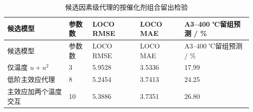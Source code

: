\begin{longtable}{L{0.28\textwidth}C{0.11\textwidth}C{0.16\textwidth}C{0.16\textwidth}C{0.19\textwidth}}
\caption{候选因素级代理的按催化剂组合留出检验}\label{tab:q3-proxy-loco}\\
\toprule
候选模型 & 参数数 & LOCO RMSE & LOCO MAE & A3--400 ℃留组预测 / \% \\
\midrule
\endfirsthead
\toprule
候选模型 & 参数数 & LOCO RMSE & LOCO MAE & A3--400 ℃留组预测 / \% \\
\midrule
\endhead
仅温度 $u+u^2$ & 3 & 5.9528 & 3.5336 & 17.99 \\
低阶主效应代理 & 8 & 5.2454 & 3.7413 & 24.25 \\
主效应加两个温度交互 & 10 & 5.3886 & 3.7351 & 26.80 \\
\bottomrule
\end{longtable}
